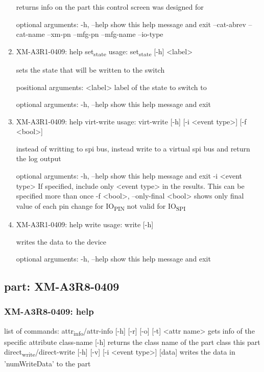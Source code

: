 \documentclass[11pt]{article}
\begin{document}
\begin{enumerate}
returns info on the part this control screen was designed for

optional arguments:
  -h, --help   show this help message and exit
  --cat-abrev
  --cat-name
  --xm-pn
  --mfg-pn
  --mfg-name
  --io-type

\item XM-A3R1-0409: help set\textsubscript{state}
\label{sec:org31cce94}
usage: set\textsubscript{state} [-h] <label>

sets the state that will be written to the switch

positional arguments:
  <label>     label of the state to switch to

optional arguments:
  -h, --help  show this help message and exit

\item XM-A3R1-0409: help virt-write
\label{sec:orgecb13a1}
usage: virt-write [-h] [-i <event type>] [-f <bool>]

instead of writting to spi bus, instead write to a virtual spi bus and return
the log output

optional arguments:
  -h, --help            show this help message and exit
  -i <event type>       If specified, include only <event type> in the
                        results. This can be specified more than once
  -f <bool>, --only-final <bool>
                        shows only final value of each pin change for IO\textsubscript{PIN}
                        not valid for IO\textsubscript{SPI}

\item XM-A3R1-0409: help write
\label{sec:org8992901}
usage: write [-h]

writes the data to the device

optional arguments:
  -h, --help  show this help message and exit
\end{enumerate}

\subsection{part: XM-A3R8-0409}
\label{sec:orgcecf1e8}
\subsubsection{XM-A3R8-0409: help}
\label{sec:orge0a9f91}
list of commands:
  attr\textsubscript{info}/attr-info [-h] [-r] [-o] [-t] <attr name>
    gets info of the specific attribute
  class-name [-h]
    returns the class name of the part class this part
  direct\textsubscript{write}/direct-write [-h] [-v] [-i <event type>] [data]
    writes the data in 'numWriteData' to the part
\end{document}
